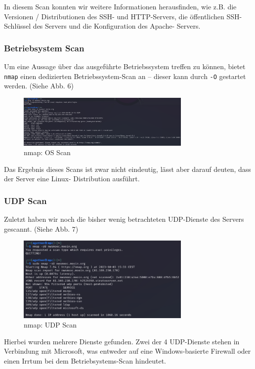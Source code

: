 \documentclass{article}
\begin{document}
In diesem Scan konnten wir weitere Informationen herausfinden, wie z.B. die Versionen / Distributionen
des SSH- und HTTP-Servers, die öffentlichen SSH-Schlüssel des Servers und die Konfiguration des Apache-
Servers.

\subsubsection*{Betriebsystem Scan}

Um eine Aussage über das ausgeführte Betriebssystem treffen zu können, bietet \texttt{nmap} einen 
dedizierten Betriebssystem-Scan an – dieser kann durch \texttt{-O} gestartet werden. (Siehe Abb. 6)

\begin{figure}[H]
	\includegraphics[width=0.75\textwidth]{images/06}
	\centering
	\caption{nmap: OS Scan}
\end{figure}

Das Ergebnis dieses Scans ist zwar nicht eindeutig, lässt aber darauf deuten, dass der Server eine Linux-
Distribution ausführt.

\subsubsection*{UDP Scan}

Zuletzt haben wir noch die bisher wenig betrachteten UDP-Dienste des Servers gescannt. (Siehe Abb. 7)

\begin{figure}[H]
	\includegraphics[width=0.75\textwidth]{images/07}
	\centering
	\caption{nmap: UDP Scan}
\end{figure}

Hierbei wurden mehrere Dienste gefunden. Zwei der 4 UDP-Dienste stehen in Verbindung mit Microsoft,
was entweder auf eine Windows-basierte Firewall oder einen Irrtum bei dem Betriebsystems-Scan hindeutet.
\end{document}
